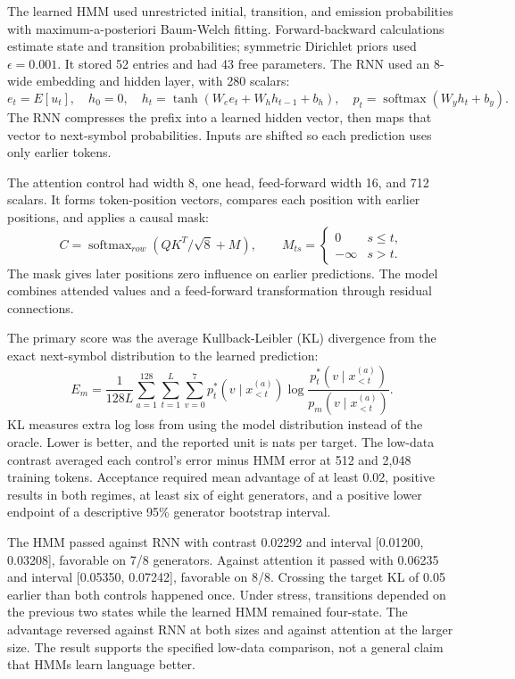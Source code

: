 The learned HMM used unrestricted initial, transition, and emission probabilities with maximum-a-posteriori Baum-Welch fitting. Forward-backward calculations estimate state and transition probabilities; symmetric Dirichlet priors used $\epsilon=0.001$. It stored 52 entries and had 43 free parameters. The RNN used an 8-wide embedding and hidden layer, with 280 scalars:
\begin{equation}
e_t=E[u_t],\quad h_0=0,\quad h_t=\tanh(W_ee_t+W_hh_{t-1}+b_h),\quad p_t=\operatorname{softmax}(W_yh_t+b_y).
\end{equation}
The RNN compresses the prefix into a learned hidden vector, then maps that vector to next-symbol probabilities. Inputs are shifted so each prediction uses only earlier tokens.

The attention control had width 8, one head, feed-forward width 16, and 712 scalars. It forms token-position vectors, compares each position with earlier positions, and applies a causal mask:
\begin{equation}
C=\operatorname{softmax}_{row}(QK^T/\sqrt8+M),\qquad M_{ts}=\begin{cases}0&s\le t,\\-\infty&s>t.\end{cases}
\end{equation}
The mask gives later positions zero influence on earlier predictions. The model combines attended values and a feed-forward transformation through residual connections.

The primary score was the average Kullback-Leibler (KL) divergence from the exact next-symbol distribution to the learned prediction:
\begin{equation}
E_m=\frac{1}{128L}\sum_{a=1}^{128}\sum_{t=1}^{L}\sum_{v=0}^{7}p_t^*(v\mid x_{<t}^{(a)})\log\frac{p_t^*(v\mid x_{<t}^{(a)})}{p_m(v\mid x_{<t}^{(a)})}.
\end{equation}
KL measures extra log loss from using the model distribution instead of the oracle. Lower is better, and the reported unit is nats per target. The low-data contrast averaged each control's error minus HMM error at 512 and 2,048 training tokens. Acceptance required mean advantage of at least 0.02, positive results in both regimes, at least six of eight generators, and a positive lower endpoint of a descriptive 95\% generator bootstrap interval.

The HMM passed against RNN with contrast 0.02292 and interval [0.01200, 0.03208], favorable on 7/8 generators. Against attention it passed with 0.06235 and interval [0.05350, 0.07242], favorable on 8/8. Crossing the target KL of 0.05 earlier than both controls happened once. Under stress, transitions depended on the previous two states while the learned HMM remained four-state. The advantage reversed against RNN at both sizes and against attention at the larger size. The result supports the specified low-data comparison, not a general claim that HMMs learn language better.

